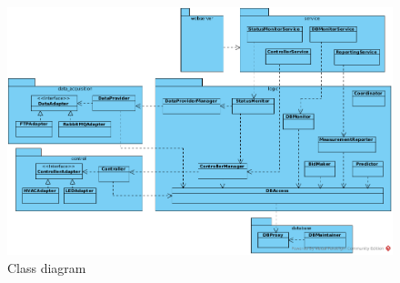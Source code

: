 \documentclass{report}
\begin{document}
\begin{figure}[H]
    \centering
    \includegraphics[width=\textwidth]{figures/class_diagram}
    \caption{Class diagram}
    \label{figureClassDiagram}
\end{figure}




%
\end{document}

